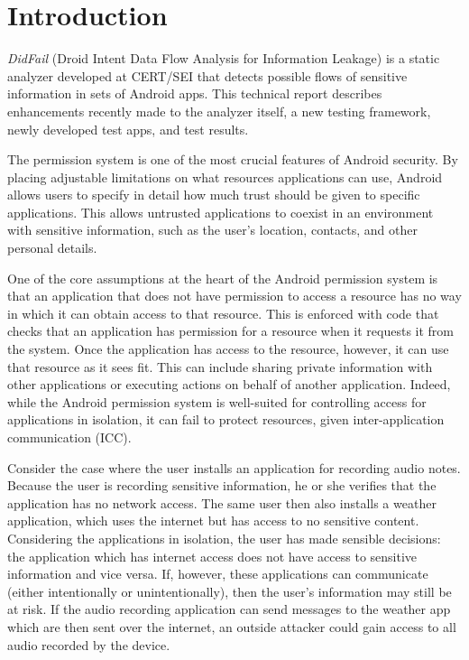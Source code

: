 \makeatletter
\patchcmd{\chapter}{\if@openright\cleardoublepage\else\clearpage\fi}{\vspace{1in}}{}{}
\makeatother

\nonfrenchspacing

\chapter{Introduction}
\label{sec:intro}
\textit{DidFail} (Droid Intent Data Flow Analysis for Information Leakage) is
a static analyzer developed at CERT/SEI that detects possible flows of sensitive
information in sets of Android apps. 
This technical report describes enhancements recently made to the analyzer
itself, a new testing framework, newly developed test apps, and test results. 

The permission system is one of the most crucial features of Android security. By placing adjustable limitations on what resources applications can use, Android allows users to specify in detail how much trust should be given to specific applications. This allows untrusted applications to coexist in an environment with sensitive information, such as the user's location, contacts, and other personal details. 

One of the core assumptions at the heart of the Android permission system is that an application that does not have permission to access a resource has no way in which it can obtain access to that resource. This is enforced with code that checks that an application has permission for a resource when it requests it from the system. Once the application has access to the resource, however, it can use that resource as it sees fit. This can include sharing private information with other applications or executing actions on behalf of another application. Indeed, while the Android permission system is well-suited for controlling access for applications in isolation, it can fail to protect resources, given inter-application communication (ICC).

Consider the case where the user installs an application for recording audio notes. Because the user is recording sensitive information, he or she verifies that the application has no network access. The same user then also installs a weather application, which uses the internet but has access to no sensitive content. Considering the applications in isolation, the user has made sensible decisions: the application which has internet access does not have access to sensitive information and vice versa. If, however, these applications can communicate (either intentionally or unintentionally), then the user's information may still be at risk. If the audio recording application can send messages to the weather app which are then sent over the internet, an outside attacker could gain access to all audio recorded by the device.

